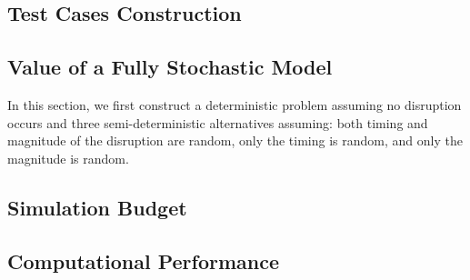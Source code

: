 \documentclass[11pt]{article}
\begin{document}
	\subsection{Test Cases Construction} \label{subsec:example}
	\subsection{Value of a Fully Stochastic Model} \label{subsec:value}
	In this section, we first construct a deterministic problem assuming no disruption occurs and three semi-deterministic alternatives assuming: both timing and magnitude of the disruption are random, only the timing is random, and only the magnitude is random.
	\subsection{Simulation Budget} \label{subsec:budget}
	\subsection{Computational Performance} \label{subsec:time}


\end{document}
